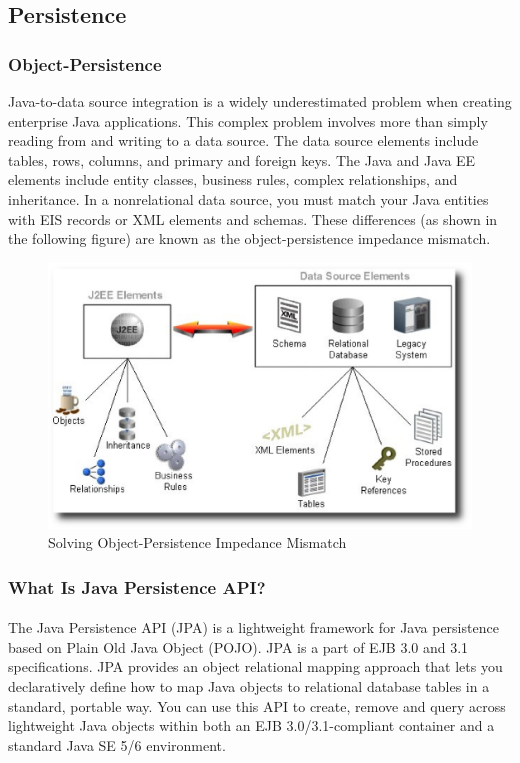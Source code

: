 \subsection{Persistence}
\subsubsection{Object-Persistence}
Java-to-data source integration is a widely underestimated problem when creating
enterprise Java applications. This complex problem involves more than simply
reading from and writing to a data source. The data source elements include
tables, rows, columns, and primary and foreign keys. The Java and Java EE
elements include entity classes, business rules, complex relationships, and
inheritance. In a nonrelational data source, you must match your Java entities
with EIS records or XML elements and schemas. These differences (as shown in the
following figure) are known as the object-persistence impedance mismatch.

\begin{figure}[!htb]
  \begin{center}
  \includegraphics[scale=0.6]{Figures/Object_Persistency_Mismatch.eps}
  \end{center}
  \caption{Solving Object-Persistence Impedance Mismatch}
  \label{Solving Object-Persistence Impedance Mismatch}
\end{figure}

\subsubsection{What Is Java Persistence API?}
\paragraph{}
The Java Persistence API (JPA) is a lightweight framework for Java persistence
based on Plain Old Java Object (POJO). JPA is a part of EJB 3.0 and 3.1
specifications. JPA provides an object relational mapping approach that lets you
declaratively define how to map Java objects to relational database tables in a
standard, portable way. You can use this API to create, remove and query across
lightweight Java objects within both an EJB 3.0/3.1-compliant container and a
standard Java SE 5/6 environment.

